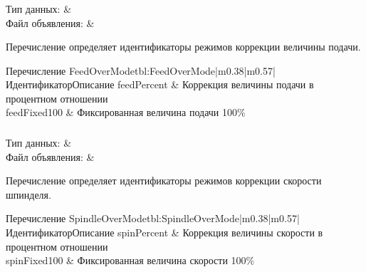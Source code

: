 \subsubsection{}
\label{sec:FeedOverMode}

\begin{fHeader}
    Тип данных:            & \\
    Файл объявления:             &  \\
\end{fHeader}

Перечисление определяет идентификаторы режимов коррекции величины подачи.

\begin{MyTableTwoColAllCntr}{Перечисление FeedOverMode}{tbl:FeedOverMode}{|m{0.38\linewidth}|m{0.57\linewidth}|}{Идентификатор}{Описание}
\hline feedPercent & Коррекция величины подачи в процентном отношении \\
\hline feedFixed100 & Фиксированная величина подачи 100\% \\
\end{MyTableTwoColAllCntr}
\subsubsection{}
\label{sec:SpindleOverMode}

\begin{fHeader}
    Тип данных:            & \\
    Файл объявления:             &  \\
\end{fHeader}

Перечисление определяет идентификаторы режимов коррекции скорости шпинделя.

\begin{MyTableTwoColAllCntr}{Перечисление SpindleOverMode}{tbl:SpindleOverMode}{|m{0.38\linewidth}|m{0.57\linewidth}|}{Идентификатор}{Описание}
\hline spinPercent & Коррекция величины скорости в процентном отношении  \\
\hline spinFixed100 & Фиксированная величина скорости 100\% \\
\end{MyTableTwoColAllCntr}
